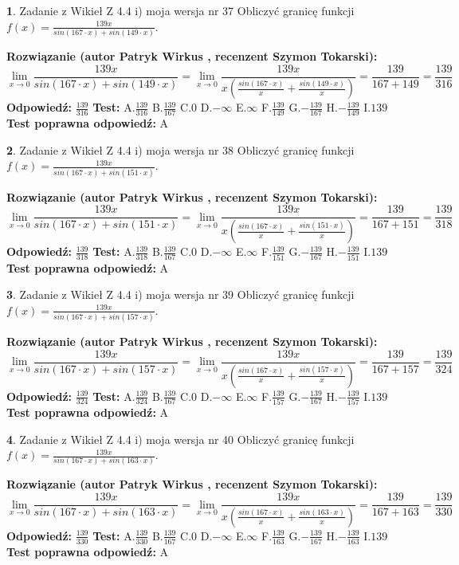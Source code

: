 \documentclass[12pt, a4paper]{article}
\theoremstyle{definition} %
\newtheorem{zad}{}
\newcommand{\zadStart}[1]{\begin{zad}#1\newline}
\newcommand{\zadStop}{\end{zad}}
\newcommand{\rozwStart}[2]{\noindent \textbf{Rozwiązanie (autor #1 , recenzent #2): }\newline}
\newcommand{\rozwStop}{\newline}
\newcommand{\odpStart}{\noindent \textbf{Odpowiedź:}\newline}
\newcommand{\odpStop}{\newline}
\newcommand{\testStart}{\noindent \textbf{Test:}\newline}
\newcommand{\testStop}{\newline}
\newcommand{\kluczStart}{\noindent \textbf{Test poprawna odpowiedź:}\newline}
\newcommand{\kluczStop}{\newline}
\begin{document}
\zadStart{Zadanie z Wikieł Z 4.4 i) moja wersja nr 37}
Obliczyć granicę funkcji $f(x)=\frac{139x}{sin(167\cdot x) +sin(149\cdot x)}$.
\zadStop
\rozwStart{Patryk Wirkus}{Szymon Tokarski}
$$\lim\limits_{x\to 0}\frac{139x}{sin(167\cdot x) +sin(149\cdot x)}=\lim\limits_{x\to 0}\frac{139x}{x(\frac{sin(167\cdot x)}{x}+\frac{sin(149\cdot x)}{x})}=\frac{139}{167+149} = \frac{139}{316}$$
\rozwStop
\odpStart
$\frac{139}{316}$
\odpStop
\testStart
A.$\frac{139}{316}$
B.$\frac{139}{167}$
C.$0$
D.$-\infty$
E.$\infty$
F.$\frac{139}{149}$
G.$-\frac{139}{167}$
H.$-\frac{139}{149}$
I.$139$
\testStop
\kluczStart
A
\kluczStop



\zadStart{Zadanie z Wikieł Z 4.4 i) moja wersja nr 38}
Obliczyć granicę funkcji $f(x)=\frac{139x}{sin(167\cdot x) +sin(151\cdot x)}$.
\zadStop
\rozwStart{Patryk Wirkus}{Szymon Tokarski}
$$\lim\limits_{x\to 0}\frac{139x}{sin(167\cdot x) +sin(151\cdot x)}=\lim\limits_{x\to 0}\frac{139x}{x(\frac{sin(167\cdot x)}{x}+\frac{sin(151\cdot x)}{x})}=\frac{139}{167+151} = \frac{139}{318}$$
\rozwStop
\odpStart
$\frac{139}{318}$
\odpStop
\testStart
A.$\frac{139}{318}$
B.$\frac{139}{167}$
C.$0$
D.$-\infty$
E.$\infty$
F.$\frac{139}{151}$
G.$-\frac{139}{167}$
H.$-\frac{139}{151}$
I.$139$
\testStop
\kluczStart
A
\kluczStop



\zadStart{Zadanie z Wikieł Z 4.4 i) moja wersja nr 39}
Obliczyć granicę funkcji $f(x)=\frac{139x}{sin(167\cdot x) +sin(157\cdot x)}$.
\zadStop
\rozwStart{Patryk Wirkus}{Szymon Tokarski}
$$\lim\limits_{x\to 0}\frac{139x}{sin(167\cdot x) +sin(157\cdot x)}=\lim\limits_{x\to 0}\frac{139x}{x(\frac{sin(167\cdot x)}{x}+\frac{sin(157\cdot x)}{x})}=\frac{139}{167+157} = \frac{139}{324}$$
\rozwStop
\odpStart
$\frac{139}{324}$
\odpStop
\testStart
A.$\frac{139}{324}$
B.$\frac{139}{167}$
C.$0$
D.$-\infty$
E.$\infty$
F.$\frac{139}{157}$
G.$-\frac{139}{167}$
H.$-\frac{139}{157}$
I.$139$
\testStop
\kluczStart
A
\kluczStop



\zadStart{Zadanie z Wikieł Z 4.4 i) moja wersja nr 40}
Obliczyć granicę funkcji $f(x)=\frac{139x}{sin(167\cdot x) +sin(163\cdot x)}$.
\zadStop
\rozwStart{Patryk Wirkus}{Szymon Tokarski}
$$\lim\limits_{x\to 0}\frac{139x}{sin(167\cdot x) +sin(163\cdot x)}=\lim\limits_{x\to 0}\frac{139x}{x(\frac{sin(167\cdot x)}{x}+\frac{sin(163\cdot x)}{x})}=\frac{139}{167+163} = \frac{139}{330}$$
\rozwStop
\odpStart
$\frac{139}{330}$
\odpStop
\testStart
A.$\frac{139}{330}$
B.$\frac{139}{167}$
C.$0$
D.$-\infty$
E.$\infty$
F.$\frac{139}{163}$
G.$-\frac{139}{167}$
H.$-\frac{139}{163}$
I.$139$
\testStop
\kluczStart
A
\kluczStop
\end{document}

